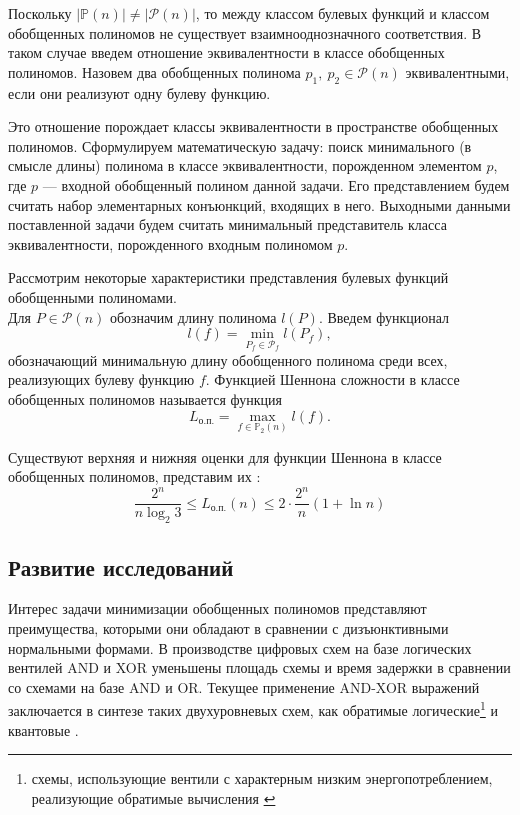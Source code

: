\documentclass[a4paper,12pt,titlepage]{article}
\begin{document}
Поскольку $ \left| \mathbb{P}(n) \right| \ne \left| \mathcal{P}(n) \right| $, то между классом булевых функций и классом обобщенных полиномов не существует взаимнооднозначного соответствия. В таком случае введем отношение эквивалентности в классе обобщенных полиномов. Назовем два обобщенных полинома $ p_1,\ p_2 \in \mathcal{P}(n) $ эквивалентными, если они реализуют одну булеву функцию.

Это отношение порождает классы эквивалентности в пространстве обобщенных полиномов. Сформулируем математическую задачу: поиск минимального (в смысле длины) полинома в классе эквивалентности, порожденном элементом $ p $, где $ p $ --- входной обобщенный полином данной задачи. Его представлением будем считать набор элементарных конъюнкций, входящих в него. Выходными данными поставленной задачи будем считать минимальный представитель класса эквивалентности, порожденного входным полиномом $ p $.

Рассмотрим некоторые характеристики представления булевых функций обобщенными полиномами.\\
Для $ P \in \mathcal{P}(n) $ обозначим длину полинома $ l(P) $. Введем функционал
$$ l(f) = \min\limits_{P_f \in \mathcal{P}_f} l(P_f), $$
обозначающий минимальную длину обобщенного полинома среди всех, реализующих булеву функцию $ f $. Функцией Шеннона сложности в классе обобщенных полиномов называется функция
$$ L_\text{о.п.} = \max\limits_{f \in \mathbb{P}_2(n)} l(f). $$

Существуют верхняя и нижняя оценки для функции Шеннона в классе обобщенных полиномов, представим их \cite{selezn}:
$$ \frac{2^n}{n \log_2 3} \le L_\text{о.п.}(n) \le 2 \cdot \frac{2^n}{n} (1 + \ln n) $$

\subsection{Развитие исследований}

Интерес задачи минимизации обобщенных полиномов представляют преимущества, которыми они обладают в сравнении с дизъюнктивными нормальными формами. В производстве цифровых схем на базе логических вентилей \textsc{AND} и \textsc{XOR} уменьшены площадь схемы и время задержки \cite{delay} в сравнении со схемами на базе \textsc{AND} и \textsc{OR}. Текущее применение \textsc{AND-XOR} выражений заключается в синтезе таких двухуровневых схем, как обратимые логические\footnote{схемы, использующие вентили с характерным низким энергопотреблением, реализующие обратимые вычисления \cite{revsynth}} \cite{reversible} и квантовые \cite{quantum}.
\end{document}
